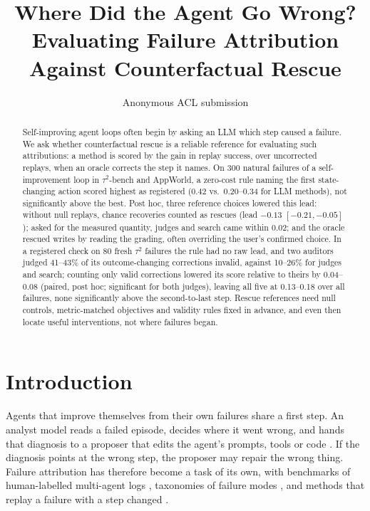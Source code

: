 \documentclass[11pt]{article}
\title{Where Did the Agent Go Wrong? Evaluating Failure Attribution\\ Against Counterfactual Rescue}
\author{Anonymous ACL submission}
\begin{document}
\maketitle

\begin{abstract}
Self-improving agent loops often begin by asking an LLM which step caused a failure. We ask whether counterfactual rescue is a reliable reference for evaluating such attributions: a method is scored by the gain in replay success, over uncorrected replays, when an oracle corrects the step it names. On 300 natural failures of a self-improvement loop in $\tau^2$-bench and AppWorld, a zero-cost rule naming the first state-changing action scored highest as registered (0.42 vs.\ 0.20--0.34 for LLM methods), not significantly above the best. Post hoc, three reference choices lowered this lead: without null replays, chance recoveries counted as rescues (lead $-0.13$ $[-0.21,-0.05]$); asked for the measured quantity, judges and search came within 0.02; and the oracle rescued writes by reading the grading, often overriding the user's confirmed choice. In a registered check on 80 fresh $\tau^2$ failures the rule had no raw lead, and two auditors judged 41--43\% of its outcome-changing corrections invalid, against 10--26\% for judges and search; counting only valid corrections lowered its score relative to theirs by 0.04--0.08 (paired, post hoc; significant for both judges), leaving all five at 0.13--0.18 over all failures, none significantly above the second-to-last step. Rescue references need null controls, metric-matched objectives and validity rules fixed in advance, and even then locate useful interventions, not where failures began.
\end{abstract}

\section{Introduction}

Agents that improve themselves from their own failures share a first step. An analyst model reads a failed episode, decides where it went wrong, and hands that diagnosis to a proposer that edits the agent's prompts, tools or code \citep{shinn2023reflexion,zhao2024expel,zhang2026ace,chen2026harnessfix,rrsi2026}. If the diagnosis points at the wrong step, the proposer may repair the wrong thing. Failure attribution has therefore become a task of its own, with benchmarks of human-labelled multi-agent logs \citep{zhang2025whichagent,liu2026whowhenpro}, taxonomies of failure modes \citep{cemri2025mast,cemri2026adamast,zhu2025agentdebug}, and methods that replay a failure with a step changed \citep{zhang2026agentracer,ma2025dover,lin2026reflect,bonagiri2026causalflow,shah2026car}.
\end{document}
